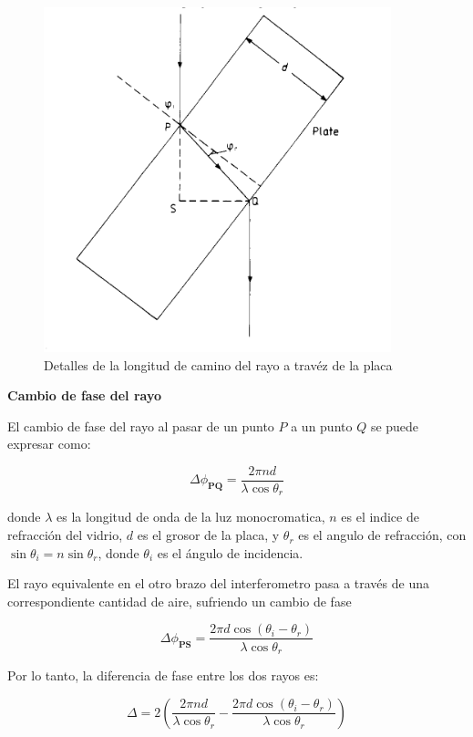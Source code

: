 \documentclass[a4paper, amsfonts, amssymb, amsmath, reprint, showkeys, nofootinbib, twoside]{revtex4-2}
\begin{document}
\begin{figure}[h!]
    \centering
    \includegraphics[width=0.8\linewidth]{camino del rayo.png}
    \caption{Detalles de la longitud de camino del rayo a travéz de la placa}
    \label{img1}
\end{figure}

\textbf{Cambio de fase del rayo}

El cambio de fase del rayo al pasar de un punto $P$ a un punto $Q$ se puede expresar como:

\begin{equation}
\Delta \phi_{\mathbf{PQ}} = \frac{2\pi n d}{\lambda \cos{\theta_r}}
\end{equation}

donde $\lambda$ es la longitud de onda de la luz monocromatica, $n$ es el indice de refracción del vidrio, $d$ es el grosor de la placa, y $\theta_r$ es el angulo de refracción, con $\sin{\theta_i}=n \sin{\theta_r}$, donde $\theta_i$ es el ángulo de incidencia.

El rayo equivalente en el otro brazo del interferometro pasa a través de una correspondiente cantidad de aire, sufriendo un cambio de fase

\begin{equation}
    \Delta\phi_{\mathbf{PS}}= \frac{2\pi d \cos{(\theta_i -\theta_r)}}{\lambda \cos{\theta_r}}
\end{equation}

Por lo tanto, la diferencia de fase entre los dos rayos es:

\begin{equation}
    \Delta = 2\left(\frac{2\pi n d}{\lambda \cos{\theta_r}} - \frac{2\pi d \cos{(\theta_i -\theta_r)}}{\lambda \cos{\theta_r}}\right)
\end{equation}
\end{document}
